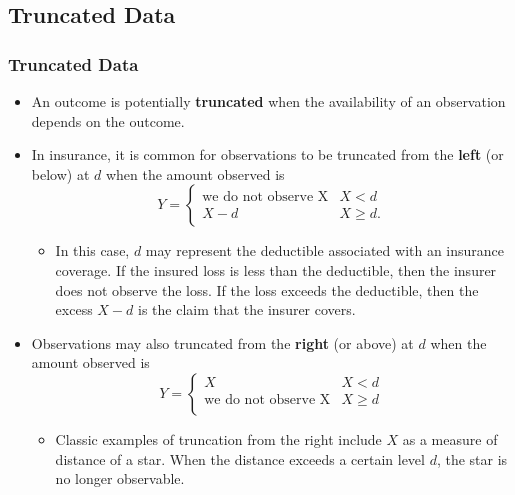 \documentclass{beamer}
\begin{document}
\subsection{Truncated Data}

\begin{frame}[shrink=.22]
\frametitle{Truncated Data}
\begin{itemize}
\item An outcome is potentially \textbf{truncated} when the availability of an observation depends on the outcome.
\item In insurance, it is common for observations to be truncated from the \textbf{left} (or below) at $d$ when the amount observed is
\begin{equation*}
Y = \begin{cases}
\text{we do not observe X}  &  X < d\\
X-d                         &   X \ge d.
\end{cases}
\end{equation*}
\vspace{-.2in}
\begin{itemize}\item In this case, $d$ may represent the deductible associated with an insurance coverage. If the insured loss is less than the deductible, then the insurer does not observe the loss. If the loss exceeds the deductible, then the excess $X-d$ is the claim that the insurer covers.
\end{itemize}
\item Observations may also truncated from the \textbf{right} (or above) at $d$ when the amount observed is
\begin{equation*}
Y = \begin{cases}
X   &   X < d  \\
\text{we do not observe X}  &  X \ge d\\
\end{cases}
\end{equation*}
\vspace{-.2in}
\begin{itemize}\item Classic examples of truncation from the right include $X$ as a measure of distance of a star. When the distance exceeds a certain level $d$, the star is no longer observable.\end{itemize}
\end{itemize}
\end{frame}
\end{document}
